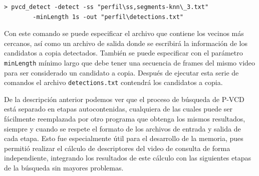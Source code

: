 \begin{lstlisting}[style=BashInputStyle]
    > pvcd_detect -detect -ss "perfil\ss,segments-knn\_3.txt"
        -minLength 1s -out "perfil\detections.txt"
\end{lstlisting}
Con este comando se puede especificar el archivo que contiene los vecinos más cercanos, así como un archivo de salida donde se escribirá la información de los candidatos a copia detectados. También se puede especificar con el parámetro \texttt{minLength} mínimo largo que debe tener una secuencia de frames del mismo video para ser considerado un candidato a copia. Después de ejecutar esta serie de comandos el archivo \texttt{detections.txt} contendrá los candidatos a copia.

De la descripción anterior podemos ver que el proceso de búsqueda de P-VCD está separado en etapas autocontenidas, cualquiera de las cuales puede ser fácilmente reemplazada por otro programa que obtenga los mismos resultados, siempre y cuando se respete el formato de los archivos de entrada y salida de cada etapa. Esto fue especialmente útil para el desarrollo de la memoria, pues permitió realizar el cálculo de descriptores del video de consulta de forma independiente, integrando los resultados de este cálculo con las siguientes etapas de la búsqueda sin mayores problemas. 
